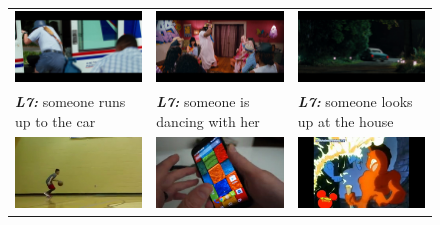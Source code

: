 \begin{figure}[thp]
  \begin{center}
  \newcommand{\mcCell}[1]{%
  \multicolumn{1}{c}{#1}}
  \centering
  \begin{adjustbox}{center}
  \tabcolsep=0.10cm
  \begin{tabular}{lll}
    \mcCell{\includegraphics[width=0.25\linewidth]{images/LsmdcVid0.png}} &
    \mcCell{\includegraphics[width=0.25\linewidth]{images/LsmdcVid1.png}} &
    \mcCell{\includegraphics[width=0.25\linewidth]{images/LsmdcVid2.png}}
    \vspace{-2mm}\\
    \textbf{\scriptsize\em L7:} \scriptsize someone runs up to the car&
    \textbf{\scriptsize\em L7:} \scriptsize someone is dancing with her&
    \textbf{\scriptsize\em L7:} \scriptsize someone looks up at the house\medskip\\
    \mcCell{\includegraphics[width=0.25\linewidth]{images/9150.png}} &
    \mcCell{\includegraphics[width=0.25\linewidth]{images/9799.png}} &
    \mcCell{\includegraphics[width=0.25\linewidth]{images/7997.png}}\vspace{-2mm} \\

\end{tabular}
\end{adjustbox}
\end{center}
\end{figure}
